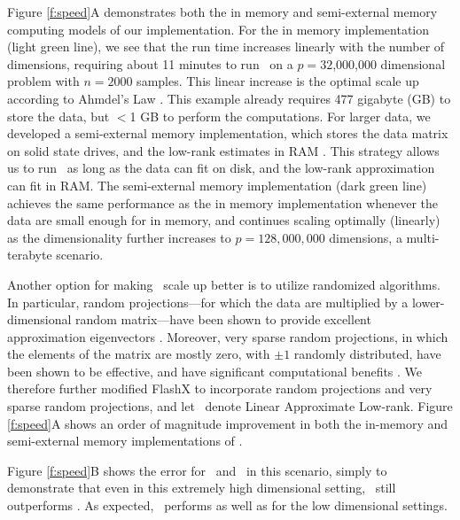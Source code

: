 \documentclass[10pt]{article}
\begin{document}
Figure \ref{f:speed}A demonstrates both the in memory and semi-external memory \cite{SEM_SpMM} computing models of our implementation.  For the in memory implementation (light green line), we see that the run time increases linearly with the number of dimensions, requiring about 11 minutes to run \Lol~on a $p=32$,$000$,$000$ dimensional problem with $n=2000$ samples.   This linear increase is the optimal scale up according to Ahmdel's Law \cite{Amdahl1967}.  This example already requires 477 gigabyte (GB) to store the data, but $<$1 GB to perform the computations.  For larger data, we developed a semi-external memory implementation, which stores the data matrix on solid state drives, and the low-rank estimates in RAM \cite{abello1998functional}.  This strategy allows us to run \Lol~as long as the data can fit on disk, and the low-rank approximation can fit in RAM.  The semi-external memory implementation (dark green line) achieves the same performance as the in memory implementation whenever the data are small enough for in memory, and continues scaling optimally (linearly) as the dimensionality further increases to $p=128,000,000$ dimensions, a multi-terabyte scenario.

Another option for making \Lol~scale up better is to utilize randomized algorithms.  In particular, random projections---for which the data are multiplied by a lower-dimensional random matrix---have been shown to provide excellent approximation eigenvectors \cite{Candes2006b}.  Moreover, very sparse random projections, in which the elements of the matrix are mostly zero, with $\pm 1$ randomly distributed, have been shown to be effective, and have significant computational benefits \cite{Hastie2006}. We therefore further modified FlashX to incorporate random projections and very sparse random projections, and let \Lal~denote Linear Approximate Low-rank.  Figure \ref{f:speed}A shows an order of magnitude improvement in both the in-memory and semi-external memory implementations of \Lal.


Figure \ref{f:speed}B shows the error for \Lol~and \PoF~in this scenario, simply to demonstrate that even in this extremely high dimensional setting, \Lol~still outperforms \PoF. As expected, \Lal~performs as well as \Lol for the low dimensional settings.

\end{document}
